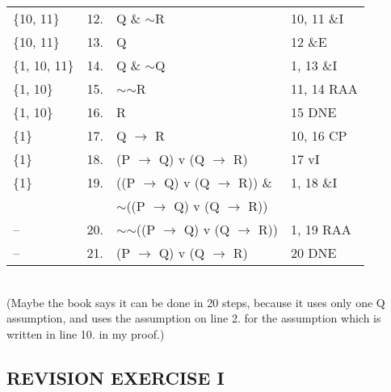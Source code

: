 \documentclass[a4paper,12pt]{article}
\newcommand{\ra}{$\rightarrow$ }
\newcommand{\s}{$\sim$}
\begin{document}
\begin{enumerate}[label=\arabic*,leftmargin=*]
\begin{enumerate}[label=\arabic*.]
\begin{minipage}{\textwidth}
\begin{tabular}{l l l l}
                        \{10, 11\} & 12. & Q \& \s R & 10, 11 \&I\\
                        \{10, 11\} & 13. & Q & 12 \&E\\
                        \{1, 10, 11\} & 14. & Q \& \s Q & 1, 13 \&I\\
                        \{1, 10\} & 15. & \s \s R & 11, 14 RAA\\
                        \{1, 10\} & 16. & R & 15 DNE\\
                        \{1\} & 17. & Q \ra R & 10, 16 CP\\
                        \{1\} & 18. & (P \ra Q) v (Q \ra R) & 17 vI\\
                        \{1\} & 19. & ((P \ra Q) v (Q \ra R)) \& & 1, 18 \&I\\
                         & & \s ((P \ra Q) v (Q \ra R)) & \\
                        -- & 20. & \s \s ((P \ra Q) v (Q \ra R)) & 1, 19 RAA\\
                        -- & 21. & (P \ra Q) v (Q \ra R) & 20 DNE\\
                    \end{tabular}\\
                    (Maybe the book says it can be done in 20 steps, because it uses only one Q assumption, and uses the assumption on line 2. for the assumption which is written in line 10. in my proof.)
                \end{minipage}

        \end{enumerate}
    \end{enumerate}

    \subsection*{REVISION EXERCISE I}
\end{document}
